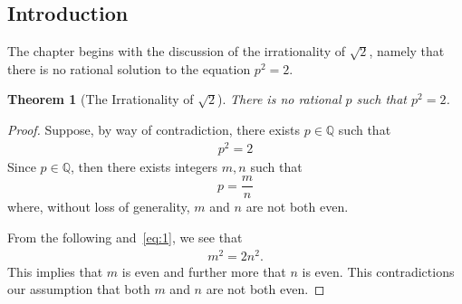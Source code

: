 \documentclass[../ch1.tex, ../../main.tex]{subfiles}
\newcommand{\bbQ}{\mathbb{Q}}
\begin{document}
\subsection{Introduction}

The chapter begins with the discussion of the irrationality of
$\sqrt{2}$, namely that there is no rational solution to the
equation $p^2 = 2$.

\newtheorem{thm}{Theorem}[subsection]
\begin{thm}[The Irrationality of $\sqrt{2}$]
    There is no rational $p$ such that $p^2 = 2$.
\end{thm}
\begin{proof}
    Suppose, by way of contradiction, there exists $p \in \bbQ$ such that
    \begin{align}
        p^2 = 2 \label{eq:1}
    \end{align}
    Since $p \in \bbQ$, then there exists integers $m, n$ such that
    $$p = \frac{m}{n}$$ where, without loss of generality,
    $m$ and $n$ are not both even.

    From the following and~\eqref{eq:1}, we see that
    \begin{align}
        m^2 = 2n^2.
    \end{align}
    This implies that $m$ is even and further more that $n$ is even.
    This contradictions our assumption that both
    $m$ and $n$ are not both even. \qedhere
\end{proof}
\end{document}
